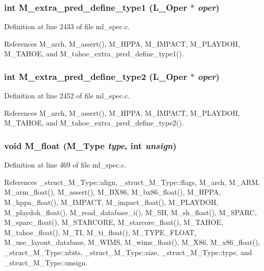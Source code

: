 \subsubsection{\setlength{\rightskip}{0pt plus 5cm}int M\_\-extra\_\-pred\_\-define\_\-type1 (L\_\-Oper $\ast$ {\em oper})}\label{ml__spec_8c_4ef8c0d417b0eb9674d10200e5515cea}




Definition at line 2433 of file ml\_\-spec.c.

References M\_\-arch, M\_\-assert(), M\_\-HPPA, M\_\-IMPACT, M\_\-PLAYDOH, M\_\-TAHOE, and M\_\-tahoe\_\-extra\_\-pred\_\-define\_\-type1().
\subsubsection{\setlength{\rightskip}{0pt plus 5cm}int M\_\-extra\_\-pred\_\-define\_\-type2 (L\_\-Oper $\ast$ {\em oper})}\label{ml__spec_8c_9b9b695131cdbd9663cf44b34209a133}




Definition at line 2452 of file ml\_\-spec.c.

References M\_\-arch, M\_\-assert(), M\_\-HPPA, M\_\-IMPACT, M\_\-PLAYDOH, M\_\-TAHOE, and M\_\-tahoe\_\-extra\_\-pred\_\-define\_\-type2().
\subsubsection{\setlength{\rightskip}{0pt plus 5cm}void M\_\-float (\bf{M\_\-Type} {\em type}, int {\em unsign})}\label{ml__spec_8c_d02fbb71b3df1b6171d32483102508a2}




Definition at line 469 of file ml\_\-spec.c.

References \_\-struct\_\-M\_\-Type::align, \_\-struct\_\-M\_\-Type::flags, M\_\-arch, M\_\-ARM, M\_\-arm\_\-float(), M\_\-assert(), M\_\-BX86, M\_\-bx86\_\-float(), M\_\-HPPA, M\_\-hppa\_\-float(), M\_\-IMPACT, M\_\-impact\_\-float(), M\_\-PLAYDOH, M\_\-playdoh\_\-float(), M\_\-read\_\-database\_\-i(), M\_\-SH, M\_\-sh\_\-float(), M\_\-SPARC, M\_\-sparc\_\-float(), M\_\-STARCORE, M\_\-starcore\_\-float(), M\_\-TAHOE, M\_\-tahoe\_\-float(), M\_\-TI, M\_\-ti\_\-float(), M\_\-TYPE\_\-FLOAT, M\_\-use\_\-layout\_\-database, M\_\-WIMS, M\_\-wims\_\-float(), M\_\-X86, M\_\-x86\_\-float(), \_\-struct\_\-M\_\-Type::nbits, \_\-struct\_\-M\_\-Type::size, \_\-struct\_\-M\_\-Type::type, and \_\-struct\_\-M\_\-Type::unsign.

